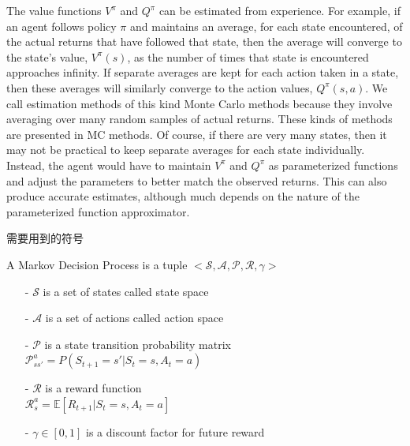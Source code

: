 The value functions $V^\pi$ and $Q^\pi$ can be estimated from experience. For example, 
if an agent follows policy $\pi$ and maintains an average, for each state encountered, 
of the actual returns that have followed that state, then the average will converge to 
the state's value, $V^\pi(s)$, as the number of times that state is encountered 
approaches infinity. If separate averages are kept for each action taken in a state, 
then these averages will similarly converge to the action values, $Q^\pi(s,a)$. We call 
estimation methods of this kind Monte Carlo methods because they involve averaging over 
many random samples of actual returns. These kinds of methods are presented in MC methods. 
Of course, if there are very many states, then it may not be practical to keep separate 
averages for each state individually. Instead, the agent would have to maintain $V^\pi$ 
and $Q^\pi$ as parameterized functions and adjust the parameters to better match the 
observed returns. This can also produce accurate estimates, although much depends on 
the nature of the parameterized function approximator.

\begin{emp_box}
需要用到的符号

A Markov Decision Process is a tuple $<\mathcal{S}, \mathcal{A}, \mathcal{P}, 
\mathcal{R}, \gamma>$
\begin{itemize}
\setlength{\parskip}{0pt}
\item[-]
$\mathcal{S}$ is a set of states called state space

\item[-]
$\mathcal{A}$ is a set of actions called action space

\item[-]
$\mathcal{P}$ is a state transition probability matrix \\
$\mathcal{P}^a_{ss'}=P(S_{t+1}=s'|S_t=s,A_t=a)$

\item[-]
$\mathcal{R}$ is a reward function \\
$ \mathcal{R}^a_s=\mathbb{E}\left[R_{t+1}|S_t=s,A_t=a\right]$

\item[-]
$\gamma\in[0, 1]$ is a discount factor for future reward
\end{itemize}

\end{emp_box}

